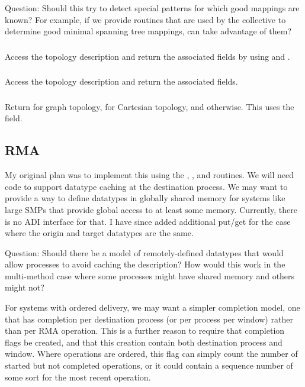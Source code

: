 \documentclass{article}
\begin{document}
Question: Should this try to detect special patterns for which good mappings
are known?  For example, if we provide routines that are used by the
collective to determine good minimal spanning tree mappings, can
 take advantage of them?

\subsubsection{}
Access the topology description and return the associated fields by using
 and .

\subsubsection{}
Access the topology description and return the associated fields.

\subsubsection{}
Return  for graph topology,  for
Cartesian topology, and  otherwise.  This uses the
 field.

\subsection{RMA}
\label{sec:rma}
My original plan was to implement this using the ,
,  and  routines.  We
will need code to support datatype caching at the destination process.
We may want to provide a way to define datatypes in globally shared
memory for systems like large SMPs that provide global access to at
least some memory.  Currently, there is no ADI interface for that.
I have since added additional put/get for the case where the origin
and target datatypes are the same.  

Question:  Should there be a model of remotely-defined datatypes that
would allow processes to avoid caching the description?  How would
this work in the multi-method case where some processes might have
shared memory and others might not?

For systems with ordered delivery, we may want a simpler completion
model, one that has completion per destination process (or per process
per window) rather than per RMA operation.  This is a further reason
to require that completion flags be created, and that this creation
contain both destination process and window.  Where operations are
ordered, this flag can simply count the number of started but not
completed operations, or it could contain a sequence number of some
sort for the most recent operation.  
\end{document}
